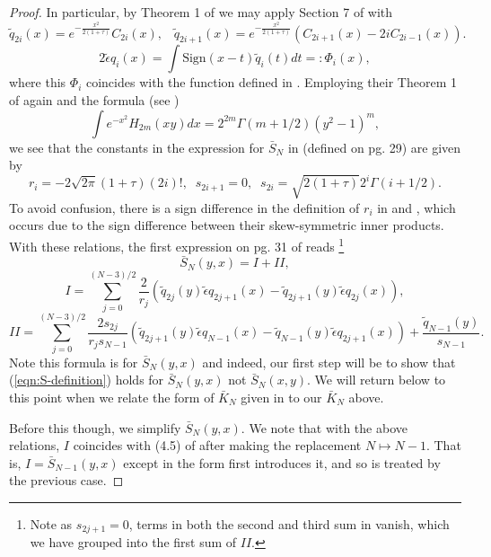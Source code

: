\documentclass[12pt]{article}
\numberwithin{info}{section}
\numberwithin{equation}{section}
\renewcommand{\[}{\begin{equation}}
\renewcommand{\]}{\end{equation}}
\newcommand{\sq}{\sqrt}
\newcommand{\sign}{\mathrm{Sign}}
\newcommand{\<}{\langle}
\renewcommand{\>}{\rangle}
\renewcommand{\sq}{\sqrt}
\newcommand{\Sb}{\bar{S}}
\begin{document}
\begin{proof}
		In particular, by Theorem 1 of \cite{forrester-elliptic} we may apply Section 7 of \cite{sinclair} with
		\[\tilde{q}_{2i}(x)=e^{-\frac{x^2}{2(1+\tau)}}C_{2i}(x),\;\;\; \tilde{q}_{2i+1}(x)=e^{-\frac{x^2}{2(1+\tau)}}(C_{2i+1}(x)-2iC_{2i-1}(x)).\]
		\[2\tilde{\epsilon}q_{i}(x)=\int \sign(x-t)\tilde{q}_i(t)dt=:\Phi_i(x),\label{eqn:ignore-luna}\]
		where this $\Phi_i$ coincides with the function defined in \cite{forrester-elliptic}. Employing their Theorem 1 of \cite{forrester-elliptic} again and the formula (see \cite{AS})
		\[\int e^{-x^2}H_{2m}(xy)dx=2^{2m}\Gamma\left(m+1/2\right)(y^2-1)^m,\]
		we see that the constants in the expression for $\Sb_N$ in \cite{sinclair} (defined on pg. 29) are given by
		\[r_i=-2\sq{2\pi}(1+\tau)(2i)!,\;\; s_{2i+1}=0, \;\; s_{2i}=\sq{2(1+\tau)}2^{i}\Gamma\left(i+1/2\right).\]
		To avoid confusion, there is a sign difference in the definition of $r_i$ in \cite{sinclair} and \cite{forrester-elliptic}, which occurs due to the sign difference between their skew-symmetric inner products. With these relations, the first expression on pg. 31 of \cite{sinclair} reads 
		\footnote{Note as $s_{2j+1}=0$, terms in both the second and third sum in \cite{sinclair} vanish, which we have grouped into the first sum of $II$.}
		\[\Sb_N(y,x)=I+II,\]
		\[I=\sum_{j=0}^{(N-3)/2}\frac{2}{r_j}\left(\tilde{q}_{2j}(y)\tilde{\epsilon}q_{2j+1}(x)-\tilde{q}_{2j+1}(y)\tilde{\epsilon}q_{2j}(x)\right),\]
		\[II=\sum_{j=0}^{(N-3)/2}\frac{2 s_{2j}}{r_j s_{N-1}}\left(\tilde{q}_{2j+1}(y)\tilde{\epsilon}q_{N-1}(x)-\tilde{q}_{N-1}(y)\tilde{\epsilon}q_{2j+1}(x)\right)+\frac{\tilde{q}_{N-1}(y)}{s_{N-1}}.\]
		Note this formula is for $\Sb_N(y,x)$ and indeed, our first step will be to show that (\ref{eqn:S-definition}) holds for $\Sb_N(y,x)$ not $\Sb_N(x,y)$. We will return below to this point when we relate the form of $\bar{K}_N$ given in \cite{sinclair} to our $\bar{K}_N$ above.
		
		Before this though, we simplify $\Sb_N(y,x)$. We note that with the above relations, $I$ coincides with (4.5) of \cite{forrester-elliptic} after making the replacement $N\mapsto N-1$. That is, $I=\bar{S}_{N-1}(y,x)$ except in the form \cite{forrester-elliptic} first introduces it, and so is treated by the previous case.
		

\end{proof}
\end{document}
